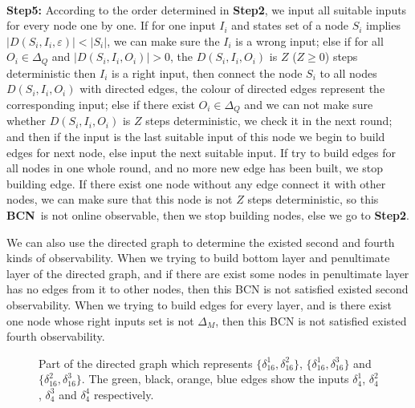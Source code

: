 \documentclass[letterpaper, 10 pt, conference]{ieeeconf}  %
\def \BCN {{\bf BCN}}
\begin{document}
\\  
{\bf Step5:} According to the order determined in {\bf Step2}, we input all suitable inputs for every node one by one. If for one input $I_i$ and states set of a node $S_i$ implies $|D\left(S_i,I_i,\varepsilon\right)|<|S_i|$, we can make sure the $I_i$ is a wrong input; else if for all $O_i \in \Delta_Q$ and $|D\left(S_i,I_i,O_i\right)|>0$, the $D\left(S_i,I_i,O_i\right)$ is $Z$ ($Z\ge 0$) steps deterministic then $I_i$ is a right input, then connect the node $S_i$ to all nodes $D\left(S_i,I_i,O_i\right)$ with directed edges, the colour of directed edges represent the corresponding input; else if there exist $O_i \in \Delta_Q$ and we can not make sure whether $D\left(S_i,I_i,O_i\right)$ is $Z$ steps deterministic, we check it in the next round; and then if the input is the last suitable input of this node we begin to build edges for next node,  else input the next suitable input. If try to build edges for all nodes in one whole round, and no more new edge has been built, we stop building edge. If there exist one node without any edge connect it with other nodes, we can make sure that this node is not $Z$ steps deterministic, so this \BCN\ is not online observable, then we stop building nodes, else we go to {\bf Step2}.

We can also use the directed graph to determine the existed second and fourth kinds of observability. When we trying to build bottom layer and penultimate layer of the directed graph, and if there are exist some nodes in penultimate layer has no edges from it to other nodes, then this BCN is not satisfied existed second observability. When we trying to build edges for every layer, and is there exist one node whose right inputs set is not $\Delta_M$, then this BCN is not satisfied existed fourth observability.
\begin{figure}[thpb]
      \centering
      
      \caption{Part of the directed graph which represents $\{\delta_{16}^1,\delta_{16}^2\}$, $\{\delta_{16}^1,\delta_{16}^3\}$ and $\{\delta_{16}^2,\delta_{16}^3\}$. The green, black, orange, blue edges show the inputs $\delta_4^1$, $\delta_4^2$, $\delta_4^3$ and $\delta_4^4$ respectively.}
      \label{fig:4}
   \end{figure}
\end{document}
